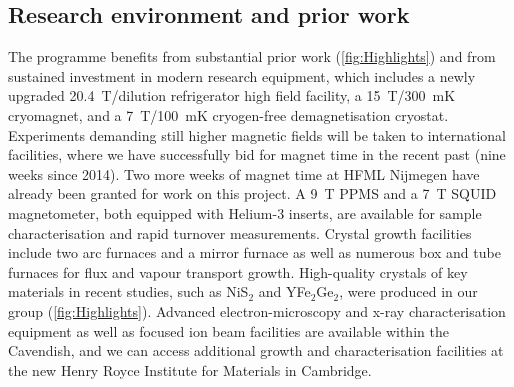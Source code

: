 

 




\subsection*{Research environment and prior work}
\noindent
The programme benefits from substantial prior work %
(\autoref{fig:Highlights}) and from sustained investment
in modern research equipment, which includes a newly upgraded 20.4~T/dilution refrigerator high field
facility, a 15~T/300~mK cryomagnet, and a
7~T/100~mK cryogen-free demagnetisation cryostat.  Experiments demanding still higher
magnetic fields will be taken to international facilities, where we
have successfully bid for magnet time in the recent past (nine weeks since
2014). Two more weeks of magnet time at HFML Nijmegen have already been granted for work on this project. %
A 9~T PPMS and a 7~T SQUID
magnetometer, both equipped with Helium-3 inserts, are available for sample
characterisation and rapid turnover measurements. %
Crystal growth facilities include %
two arc furnaces and a mirror furnace as well as numerous box and tube
furnaces for flux and vapour transport growth. High-quality crystals of key materials in recent studies,
such as NiS$_2$ and YFe$_2$Ge$_2$, were produced in our group
(\autoref{fig:Highlights}).  
Advanced electron-microscopy and x-ray characterisation
equipment as well as focused ion beam facilities are available within
the Cavendish, and we can access additional growth and
characterisation facilities at the new Henry Royce Institute for
Materials in Cambridge.



